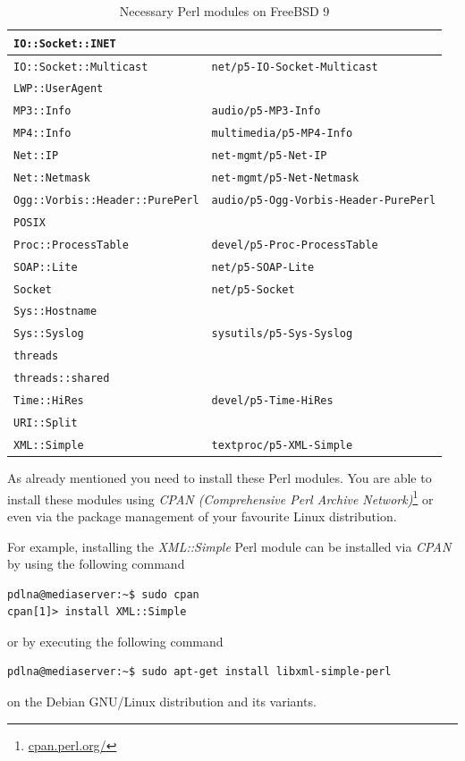 \documentclass[a4paper,oneside,10pt]{report}
\begin{document}
\begin{table}
\begin{tabular}{|p{15em}|p{18em}|}
		\hline
		\verb|IO::Socket::INET| 							& \\
		\hline
		\verb|IO::Socket::Multicast| 					& \verb|net/p5-IO-Socket-Multicast| \\
		\hline
		\verb|LWP::UserAgent| 								& \\
		\hline
		\verb|MP3::Info| 											& \verb|audio/p5-MP3-Info| \\
		\hline
		\verb|MP4::Info| 											& \verb|multimedia/p5-MP4-Info| \\
		\hline
		\verb|Net::IP| 												& \verb|net-mgmt/p5-Net-IP| \\
		\hline
		\verb|Net::Netmask| 									& \verb|net-mgmt/p5-Net-Netmask| \\
		\hline
		\verb|Ogg::Vorbis::Header::PurePerl|	& \verb|audio/p5-Ogg-Vorbis-Header-PurePerl| \\
		\hline
		\verb|POSIX| 													& \\
		\hline
		\verb|Proc::ProcessTable| 						& \verb|devel/p5-Proc-ProcessTable| \\
		\hline
		\verb|SOAP::Lite| 										& \verb|net/p5-SOAP-Lite| \\
		\hline
		\verb|Socket| 												& \verb|net/p5-Socket| \\
		\hline
		\verb|Sys::Hostname| 									& \\
		\hline
		\verb|Sys::Syslog| 										& \verb|sysutils/p5-Sys-Syslog| \\
		\hline
		\verb|threads| 												& \\
		\hline
		\verb|threads::shared| 								& \\
		\hline
		\verb|Time::HiRes|										& \verb|devel/p5-Time-HiRes| \\
		\hline
		\verb|URI::Split| 										& \\
		\hline
		\verb|XML::Simple| 										& \verb|textproc/p5-XML-Simple| \\
		\hline
	\end{tabular}
	\caption{Necessary Perl modules on FreeBSD 9}
	\label{tab:NecessaryPerlModulesFreeBSD9}
\end{table}

As already mentioned you need to install these Perl modules. You are able to install these modules using {\em CPAN (Comprehensive Perl Archive Network)}\footnote{\url{cpan.perl.org/}} or even via the package management of your favourite Linux distribution.

For example, installing the {\em XML::Simple} Perl module can be installed via {\em CPAN} by using the following command
\begin{lstlisting}
pdlna@mediaserver:~$ sudo cpan
cpan[1]> install XML::Simple
\end{lstlisting}
or by executing the following command
\begin{lstlisting}
pdlna@mediaserver:~$ sudo apt-get install libxml-simple-perl
\end{lstlisting}
on the Debian GNU/Linux distribution and its variants.
\end{document}
